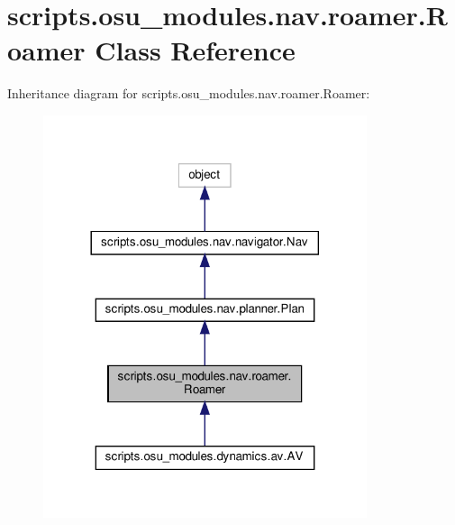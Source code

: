 \hypertarget{classscripts_1_1osu__modules_1_1nav_1_1roamer_1_1Roamer}{}\section{scripts.\+osu\+\_\+modules.\+nav.\+roamer.\+Roamer Class Reference}
\label{classscripts_1_1osu__modules_1_1nav_1_1roamer_1_1Roamer}


Inheritance diagram for scripts.\+osu\+\_\+modules.\+nav.\+roamer.\+Roamer\+:\nopagebreak
\begin{figure}[H]
\begin{center}
\leavevmode
\includegraphics[width=269pt]{dc/dcc/classscripts_1_1osu__modules_1_1nav_1_1roamer_1_1Roamer__inherit__graph}
\end{center}
\end{figure}


